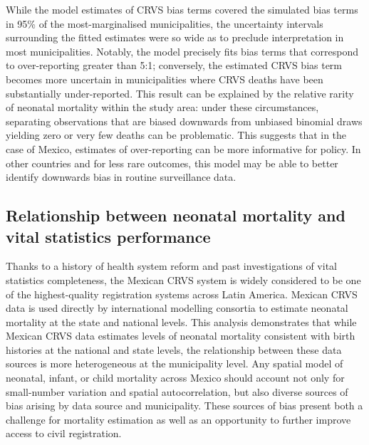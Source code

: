 \documentclass[
]{report}
\begin{document}
While the model estimates of CRVS bias terms covered the simulated bias terms in 95\% of the most-marginalised municipalities, the uncertainty intervals surrounding the fitted estimates were so wide as to preclude interpretation in most municipalities. Notably, the model precisely fits bias terms that correspond to over-reporting greater than 5:1; conversely, the estimated CRVS bias term becomes more uncertain in municipalities where CRVS deaths have been substantially under-reported. This result can be explained by the relative rarity of neonatal mortality within the study area: under these circumstances, separating observations that are biased downwards from unbiased binomial draws yielding zero or very few deaths can be problematic. This suggests that in the case of Mexico, estimates of over-reporting can be more informative for policy. In other countries and for less rare outcomes, this model may be able to better identify downwards bias in routine surveillance data.

\hypertarget{relationship-between-neonatal-mortality-and-vital-statistics-performance}{%
\subsection{Relationship between neonatal mortality and vital statistics performance}\label{relationship-between-neonatal-mortality-and-vital-statistics-performance}}

Thanks to a history of health system reform and past investigations of vital statistics completeness, the Mexican CRVS system is widely considered to be one of the highest-quality registration systems across Latin America.\autocite{Frenk2006,Mikkelsen2015} Mexican CRVS data is used directly by international modelling consortia to estimate neonatal mortality at the state and national levels.\autocite{UNInter-agencyGrouponMortalityEstimationUNIGME2020,Dicker2018} This analysis demonstrates that while Mexican CRVS data estimates levels of neonatal mortality consistent with birth histories at the national and state levels, the relationship between these data sources is more heterogeneous at the municipality level. Any spatial model of neonatal, infant, or child mortality across Mexico should account not only for small-number variation and spatial autocorrelation, but also diverse sources of bias arising by data source and municipality. These sources of bias present both a challenge for mortality estimation as well as an opportunity to further improve access to civil registration.
\end{document}
